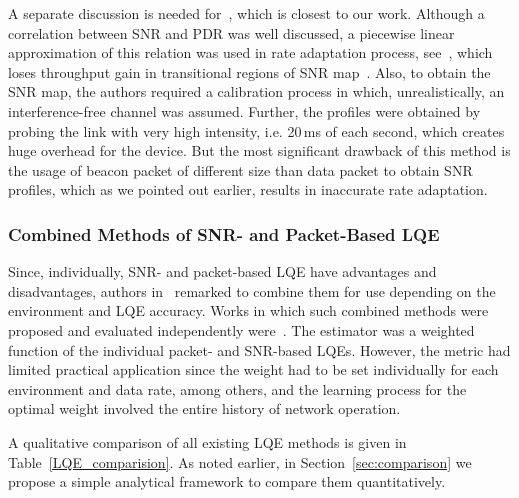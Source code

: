 \documentclass[11pt,draftclsnofoot,journal,onecolumn]{IEEEtran}
\begin{document}
A separate discussion is needed for~\cite{Zhang_Infocom_2008}, which is closest to our work. Although a correlation between SNR and PDR was well discussed, a piecewise linear approximation of this relation was used in rate adaptation process, see~\cite[Fig. 7]{Zhang_Infocom_2008}, which loses throughput gain in transitional regions of SNR map~\cite[Fig. 3]{zuniga_2004_secon}. Also, to obtain the SNR map, the authors required a calibration process in which, unrealistically, an interference-free channel was assumed. Further, the profiles were obtained by probing the link with very high intensity, i.e. 20\,ms of each second, which creates huge overhead for the device. But the most significant drawback of this method is the usage of beacon packet of different size than data packet to obtain SNR profiles, which as we pointed out earlier, results in inaccurate rate adaptation.

\subsubsection{Combined Methods of SNR- and Packet-Based LQE}
\label{sec:LQE_combined}

Since, individually, SNR- and packet-based LQE have advantages and disadvantages, authors in~\cite{vlavianos_2008_PIMRC} remarked to combine them for use depending on the environment and LQE accuracy. Works in which such combined methods were proposed and evaluated independently were~\cite{zhou_2009_CCNC,Fonseca_Hotnets_2007,Zhou_Pernets_2007}. The estimator was a weighted function of the individual packet- and SNR-based LQEs. However, the metric had limited practical application since the weight had to be set individually for each environment and data rate, among others, and the learning process for the optimal weight involved the entire history of network operation.

A qualitative comparison of all existing LQE methods is given in Table~\ref{LQE_comparision}. As noted earlier, in Section~\ref{sec:comparison} we propose a simple analytical framework to compare them quantitatively.
\end{document}

